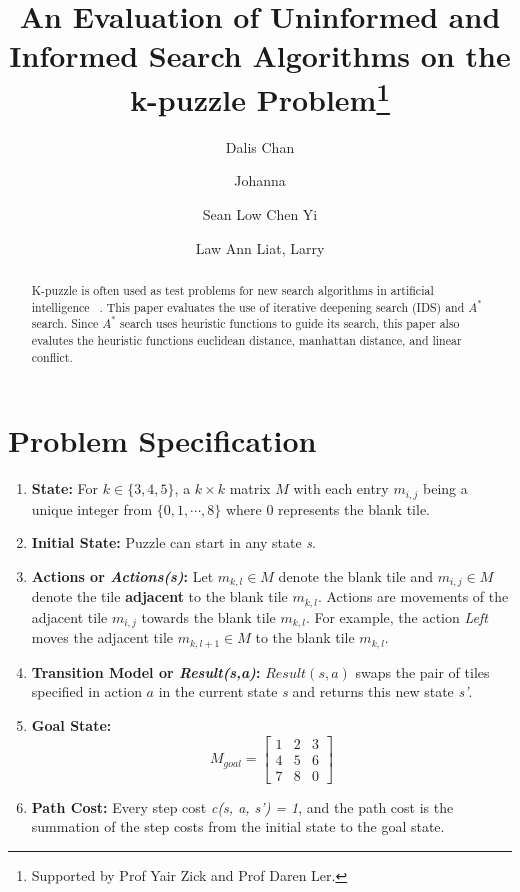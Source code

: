 \documentclass[runningheads]{llncs}
\begin{document}
%
\title{An Evaluation of Uninformed and Informed Search Algorithms on the k-puzzle Problem\thanks{Supported by Prof Yair Zick and Prof Daren Ler.}}
%
%
\author{Dalis Chan \and
Johanna  \and
Sean Low Chen Yi  \and 
Law Ann Liat, Larry }
%
%
%
\maketitle              %
%
\begin{abstract}
K-puzzle is often used as test problems for new search algorithms in artificial intelligence ~\cite[p71]{stuart_russell_artifical_2010}. This paper evaluates the use of iterative deepening search (IDS) and \( A^* \) search. 
Since \( A^* \) search uses heuristic functions to guide its search, this paper also evalutes the heuristic functions euclidean distance, manhattan distance, and linear conflict.
\end{abstract}
%
%
%
\section{Problem Specification}
\begin{enumerate}
    \item \textbf{State:} For \( k \in \{3, 4, 5\} \),  a \( k \times k \) matrix \( M \) with each entry \( m_{i, j} \) being a unique integer from \( \{0, 1, \cdots, 8 \} \) where 0 represents the blank tile.
    \item \textbf{Initial State:} Puzzle can start in any state \textit{s}.
    \item \textbf{Actions or \textit{Actions(s)}:} Let \( m_{k, l} \in M \) denote the blank tile and \( m_{i, j} \in M \) denote the tile \textbf{adjacent} to the blank tile \( m_{k, l} \).
    Actions are movements of the adjacent tile \( m_{i, j} \) towards the blank tile \( m_{k, l} \). For example, the action \textit{Left} moves the adjacent tile \( m_{k, l+1} \in M \) to the blank tile \( m_{k, l} \).
    \item \textbf{Transition Model or \textit{Result(s,a)}:} \( Result(s, a) \) swaps the pair of tiles specified in action \( a \) in the current state \textit{s} and returns this new state \textit{s'}.
    \item \textbf{Goal State:}
    \[
    M_{goal}= \begin{bmatrix}
        1 & 2 & 3 \\
        4 & 5 & 6 \\
        7 & 8 & 0
        \end{bmatrix}
    \]
    \item \textbf{Path Cost:} Every step cost \textit{c(s, a, s') = 1}, and the path cost is the summation of the step costs from the initial state to the goal state.
\end{enumerate}
\end{document}

